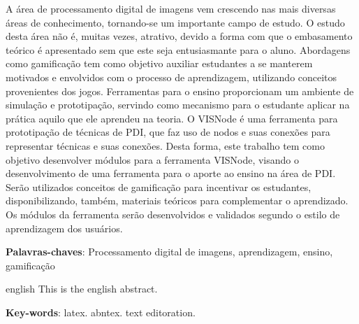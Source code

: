 \documentclass[
	12pt,				%
	oneside,			%
	a4paper,			%
	english,			%
	french,				%
	spanish,			%
	brazil,				%
	]{abntex2}
\begin{document}
\frenchspacing 


\imprimircapa
\imprimirfolhaderosto





\begin{resumo}
A área de processamento digital de imagens vem crescendo nas mais diversas áreas de conhecimento, tornando-se um importante campo de estudo. O estudo desta área não é, muitas vezes, atrativo, devido a forma com que o embasamento teórico é apresentado sem que este seja entusiasmante para o aluno. Abordagens como gamificação tem como objetivo auxiliar estudantes a se manterem motivados e envolvidos com o processo de aprendizagem, utilizando conceitos provenientes dos jogos. Ferramentas para o ensino proporcionam um ambiente de simulação e prototipação, servindo como mecanismo para o estudante aplicar na prática aquilo que ele aprendeu na teoria. O VISNode é uma ferramenta para prototipação de técnicas de PDI, que faz uso de nodos e suas conexões para representar técnicas e suas conexões. Desta forma, este trabalho tem como objetivo desenvolver módulos para a ferramenta VISNode, visando o desenvolvimento de uma ferramenta para o aporte ao ensino na área de PDI. Serão utilizados conceitos de gamificação para incentivar os estudantes, disponibilizando, também, materiais teóricos para complementar o aprendizado. Os módulos da ferramenta serão desenvolvidos e validados segundo o estilo de aprendizagem dos usuários.

 \vspace{\onelineskip}
    
 \noindent
 \textbf{Palavras-chaves}: Processamento digital de imagens, aprendizagem, ensino, gamificação
\end{resumo}

\begin{resumo}[Abstract]
 \begin{otherlanguage*}{english}
   This is the english abstract.

   \vspace{\onelineskip}
 
   \noindent 
   \textbf{Key-words}: latex. abntex. text editoration.
 \end{otherlanguage*}
\end{resumo}
\end{document}
